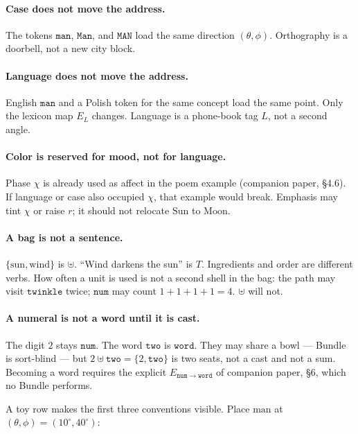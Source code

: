 \documentclass[12pt, a4paper]{article}
\begin{document}
\paragraph{Case does not move the address.}
The tokens $\texttt{man}$, $\texttt{Man}$, and $\texttt{MAN}$ load the
same direction $(\theta,\phi)$. Orthography is a doorbell, not a new
city block.

\paragraph{Language does not move the address.}
English $\texttt{man}$ and a Polish token for the same concept load the
same point. Only the lexicon map $E_L$ changes. Language is a
phone-book tag $L$, not a second angle.

\paragraph{Color is reserved for mood, not for language.}
Phase $\chi$ is already used as affect in the poem example
(companion paper, \S4.6). If language or case also
occupied $\chi$, that example would break. Emphasis may tint $\chi$
or raise $r$; it should not relocate $\mathrm{Sun}$ to $\mathrm{Moon}$.

\paragraph{A bag is not a sentence.}
$\{\mathrm{sun},\mathrm{wind}\}$ is $\uplus$.
``Wind darkens the sun'' is $T$. Ingredients and order are different
verbs. How often a unit is used is not a second shell in the bag:
the path may visit $\texttt{twinkle}$ twice; $\mathtt{num}$ may
count $1+1+1+1=4$. $\uplus$ will not.

\paragraph{A numeral is not a word until it is cast.}
The digit $2$ stays $\mathtt{num}$. The word $\texttt{two}$ is
$\mathtt{word}$. They may share a bowl --- Bundle is sort-blind ---
but $2\uplus\texttt{two}=\{2,\texttt{two}\}$ is two seats, not a cast
and not a sum. Becoming a word requires the explicit
$E_{\mathtt{num}\to\mathtt{word}}$ of
companion paper, \S6, which no Bundle performs.

A toy row makes the first three conventions visible. Place
$\mathrm{man}$ at $(\theta,\phi)=(10^\circ,40^\circ)$:
\end{document}
